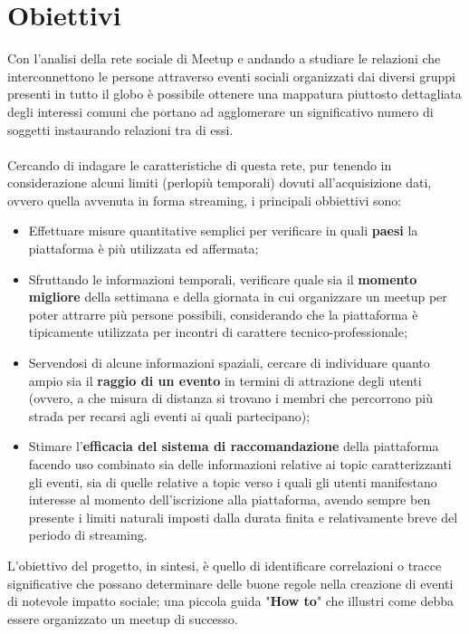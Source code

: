 \documentclass[fleqn,10pt]{SelfArx} %
\begin{document}
\section{Obiettivi}
{\small
Con l'analisi della rete sociale di Meetup e andando a studiare le relazioni che interconnettono le persone attraverso eventi sociali organizzati dai diversi gruppi presenti in tutto il globo è possibile ottenere una mappatura piuttosto dettagliata degli interessi comuni che portano ad agglomerare un significativo numero di soggetti instaurando relazioni tra di essi.
\\
\\
Cercando di indagare le caratteristiche di questa rete, pur tenendo in considerazione alcuni limiti (perlopiù temporali) dovuti all'acquisizione dati, ovvero quella avvenuta in forma streaming, i principali obbiettivi sono:
\begin{itemize}
\item Effettuare misure quantitative semplici per verificare in quali \textbf{paesi} la piattaforma è più utilizzata ed affermata;
\item Sfruttando le informazioni temporali, verificare quale sia il \textbf{momento migliore} della settimana e della giornata in cui organizzare un meetup per poter attrarre più persone possibili, considerando che la piattaforma è tipicamente utilizzata per incontri di carattere tecnico-professionale;
\item Servendosi di alcune informazioni spaziali, cercare di individuare quanto ampio sia il \textbf{raggio di un evento} in termini di attrazione degli utenti (ovvero, a che misura di distanza si trovano i membri che percorrono più strada per recarsi agli eventi ai quali partecipano);
\item Stimare l'\textbf{efficacia del sistema di raccomandazione} della piattaforma facendo uso combinato sia delle informazioni relative ai topic caratterizzanti gli eventi, sia di quelle relative a topic verso i quali gli utenti manifestano interesse al momento dell'iscrizione alla piattaforma, avendo sempre ben presente i limiti naturali imposti dalla durata finita e relativamente breve del periodo di streaming.
\end{itemize}
L'obiettivo del progetto, in sintesi, è quello di identificare correlazioni o tracce significative che possano determinare delle buone regole nella creazione di eventi di notevole impatto sociale; una piccola guida "\textbf{How to}" che illustri come debba  essere organizzato un meetup di successo.
}
\end{document}
